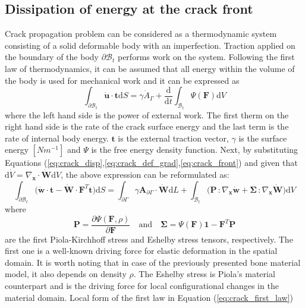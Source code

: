 \documentclass[11pt]{ACMEarticle}
\numberwithin{equation}{section}
\begin{document}
\subsection{Dissipation of energy at the crack front}
Crack propagation problem can be considered as a thermodynamic system consisting of a solid deformable body with an imperfection. Traction applied on the boundary of the body $\partial \mathcal B_t$ performs work on the system. Following the first law of thermodynamics, it can be assumed that all energy within the volume of the body is used for mechanical work and it can be expressed as 
\begin{equation}
\int_{\partial \mathcal B_t} \mathbf{\dot u} \cdot \mathbf t \mathrm d S = \gamma \dot A_\Gamma +{\frac{\mathrm d}{\mathrm d t }} \int_{\mathcal B_t} \Psi(\mathbf F) \mathrm d V
\end{equation}
where the left hand side is the power of external work. The first therm on the right hand side is the rate of the crack surface energy and the last term is the rate of internal body energy. $\mathbf t$ is the external traction vector, $\gamma $ is the surface energy $[ N m^{-1} ]$ and $\Psi$ is the free energy density function. Next, by substituting Equations (\ref{eq:crack_disp},\ref{eq:crack_def_grad},\ref{eq:crack_front}) and given that $\mathrm d \dot V = \nabla _{\mathbf x} \cdot \mathbf{\dot W} \mathrm d V$, the above expression can be reformulated as:
\begin{equation}\label{eq:crack_first_law}
\int_{\partial \mathcal B_t} \big( \mathbf{\dot w} \cdot \mathbf t - \mathbf{\dot W} \cdot \mathbf F^T \mathbf t \big) \mathrm d S = \int_{\partial \Gamma } \gamma \mathbf A_{\partial \Gamma} \cdot \mathbf{\dot W} \mathrm d L + \int_{\mathcal B_t} \big( \mathbf P\, \colon \nabla_{\mathbf x} \mathbf{\dot w} +\mathbf  \Sigma\, \colon \nabla_{\mathbf x} \mathbf{\dot W} \big) \mathrm d V 
\end{equation}
where
\begin{equation}
\mathbf P = \frac{\partial \Psi (\mathbf F, \rho)}{\partial \mathbf F} \quad \mathrm{and } \quad \mathbf \Sigma = \Psi(\mathbf F) \mathbf  1 - \mathbf F^T \mathbf P
\end{equation}
are the first Piola-Kirchhoff stress and Eshelby stress tensors, respectively. The first one is a well-known driving force for elastic deformation in the spatial domain. It is worth noting that in case of the previously presented bone material model, it also depends on density $\rho$. The Eshelby stress is Piola's material counterpart and is the driving force for local configurational changes in the material domain. Local form of the first law in Equation (\ref{eq:crack_first_law})
\end{document}
